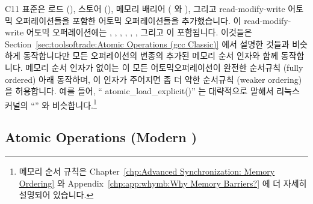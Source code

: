 C11 표준은 로드 (), 스토어 (), 메모리
배리어 ( 와 ), 그리고
read-modify-write 어토믹 오퍼레이션들을 포함한 어토믹 오퍼레이션들을
추가했습니다.
이 read-modify-write 어토믹 오퍼레이션에는
,
,
,
,
,
,
그리고
이 포함됩니다.
이것들은
Section~\ref{sec:toolsoftrade:Atomic Operations (gcc Classic)}
에서 설명한 것들과 비슷하게 동작합니다만 모든 오퍼레이션의 
변종의 추가된 메모리 순서 인자와 함께 동작합니다.
메모리 순서 인자가 없이는 이 모든 어토믹오퍼레이션이 완전한 순서규칙 (fully
ordered) 아래 동작하며, 이 인자가 주어지면 좀 더 약한 순서규칙 (weaker
ordering) 을 허용합니다.
예를 들어, ``
{atomic_load_explicit()}'' 는 대략적으로 말해서 리눅스 커널의
``'' 와 비슷합니다.\footnote{
	메모리 순서 규칙은
	Chapter~\ref{chp:Advanced Synchronization: Memory Ordering} 와
	Appendix~\ref{chp:app:whymb:Why Memory Barriers?}
	에 더 자세히 설명되어 있습니다.}

\subsection{Atomic Operations (Modern \GCC)}
\label{sec:toolsoftrade:Atomic Operations (Modern gcc)}

